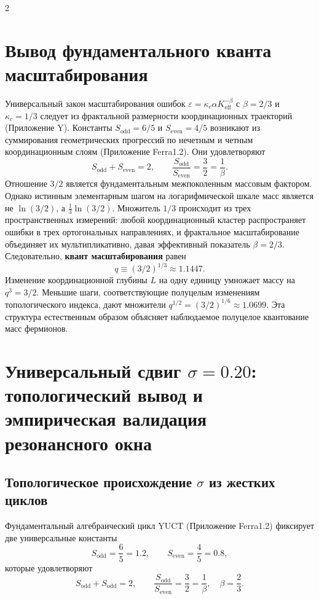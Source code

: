 \documentclass[11pt,a4paper]{article}
\newcommand{\Sodd}{S_{\mathrm{odd}}}
\newcommand{\Seven}{S_{\mathrm{even}}}
\begin{document}
\begin{multicols}{2}
		\section{Вывод фундаментального кванта масштабирования}
		\label{sec:derivation}
		
		Универсальный закон масштабирования ошибок \(\varepsilon = \kappa_c \alpha K_{\mathrm{eff}}^{-\beta}\) с \(\beta = 2/3\) и \(\kappa_c = 1/3\) следует из фрактальной размерности координационных траекторий (Приложение Y). Константы \(\Sodd = 6/5\) и \(\Seven = 4/5\) возникают из суммирования геометрических прогрессий по нечетным и четным координационным слоям (Приложение Ferra1.2). Они удовлетворяют
		\[
		\Sodd + \Seven = 2, \qquad \frac{\Sodd}{\Seven} = \frac{3}{2} = \frac{1}{\beta}.
		\]
		Отношение \(3/2\) является фундаментальным межпоколенным массовым фактором. Однако истинным элементарным шагом на логарифмической шкале масс является не \(\ln(3/2)\), а \(\frac{1}{3}\ln(3/2)\). Множитель \(1/3\) происходит из трех пространственных измерений: любой координационный кластер распространяет ошибки в трех ортогональных направлениях, и фрактальное масштабирование объединяет их мультипликативно, давая эффективный показатель \(\beta = 2/3\). Следовательно, \textbf{квант масштабирования} равен
		\begin{equation}
			q \equiv (3/2)^{1/3} \approx 1.1447.
		\end{equation}
		Изменение координационной глубины \(L\) на одну единицу умножает массу на \(q^3 = 3/2\). Меньшие шаги, соответствующие полуцелым изменениям топологического индекса, дают множители \(q^{1/2} = (3/2)^{1/6} \approx 1.0699\). Эта структура естественным образом объясняет наблюдаемое полуцелое квантование масс фермионов.
		
		\section{Универсальный сдвиг \(\sigma = 0.20\): топологический вывод и эмпирическая валидация резонансного окна}
		\label{sec:sigma}
		
		\subsection{Топологическое происхождение \(\sigma\) из жестких циклов}
		
		Фундаментальный алгебраический цикл YUCT (Приложение Ferra1.2) фиксирует две универсальные константы
		\[
		S_{\mathrm{odd}} = \frac{6}{5} = 1.2,\qquad S_{\mathrm{even}} = \frac{4}{5} = 0.8,
		\]
		которые удовлетворяют
		\[
		S_{\mathrm{odd}} + S_{\mathrm{odd}} = 2,\qquad \frac{S_{\mathrm{odd}}}{S_{\mathrm{even}}} = \frac{3}{2} = \frac{1}{\beta},\quad \beta = \frac{2}{3}.
		\]
		

\end{multicols}
\end{document}
